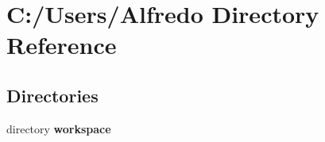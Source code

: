 \section{C\+:/\+Users/\+Alfredo Directory Reference}
\label{dir_56470f6afa2515b87397cb24ad473cd8}
\subsection*{Directories}
\begin{DoxyCompactItemize}
\item 
directory {\bf workspace}
\end{DoxyCompactItemize}
